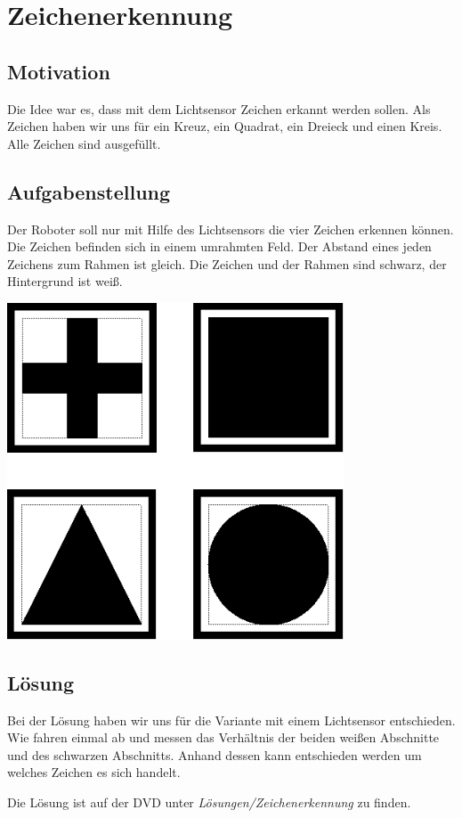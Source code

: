 \chapter{Zeichenerkennung}
\section{Motivation}
Die Idee war es, dass mit dem Lichtsensor Zeichen erkannt werden sollen. Als Zeichen haben wir uns für ein Kreuz, ein Quadrat, ein Dreieck und einen Kreis. Alle Zeichen sind ausgefüllt.

\section{Aufgabenstellung}
Der Roboter soll nur mit Hilfe des Lichtsensors die vier Zeichen erkennen können. Die Zeichen befinden sich in einem umrahmten Feld. Der Abstand eines jeden Zeichens zum Rahmen ist gleich. Die Zeichen und der Rahmen sind schwarz, der Hintergrund ist weiß.

\begin{capfigure}
	\includegraphics[width=10cm]{images/zeichen/combo}
\end{capfigure}

\section{Lösung}

Bei der Lösung haben wir uns für die Variante mit einem Lichtsensor entschieden. Wie fahren einmal ab und messen das Verhältnis der beiden weißen Abschnitte und des schwarzen Abschnitts. Anhand dessen kann entschieden werden um welches Zeichen es sich handelt.

Die Lösung ist auf der DVD unter \textit{Lösungen/Zeichenerkennung} zu finden.